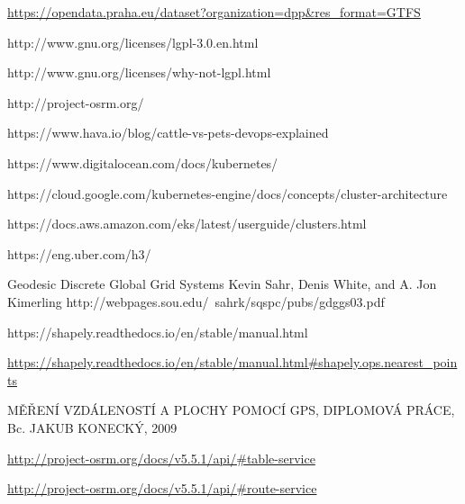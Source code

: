 \documentclass[thesis=M,czech]{FITthesis}[2019/12/23]
\theoremstyle{plain}
\theoremstyle{definition}
\begin{document}
\begin{thebibliography}{9}


\url{https://opendata.praha.eu/dataset?organization=dpp&res_format=GTFS}



http://www.gnu.org/licenses/lgpl-3.0.en.html



http://www.gnu.org/licenses/why-not-lgpl.html


http://project-osrm.org/


https://www.hava.io/blog/cattle-vs-pets-devops-explained



https://www.digitalocean.com/docs/kubernetes/


https://cloud.google.com/kubernetes-engine/docs/concepts/cluster-architecture


https://docs.aws.amazon.com/eks/latest/userguide/clusters.html



https://eng.uber.com/h3/



Geodesic Discrete Global Grid Systems
Kevin Sahr, Denis White, and A. Jon Kimerling
http://webpages.sou.edu/~sahrk/sqspc/pubs/gdggs03.pdf


https://shapely.readthedocs.io/en/stable/manual.html




\url{https://shapely.readthedocs.io/en/stable/manual.html#shapely.ops.nearest_points}


MĚŘENÍ VZDÁLENOSTÍ A PLOCHY POMOCÍ GPS, DIPLOMOVÁ PRÁCE,  Bc. JAKUB KONECKÝ, 2009



\url{http://project-osrm.org/docs/v5.5.1/api/#table-service}


\url{http://project-osrm.org/docs/v5.5.1/api/#route-service}




\end{thebibliography}


\appendix
\end{document}
